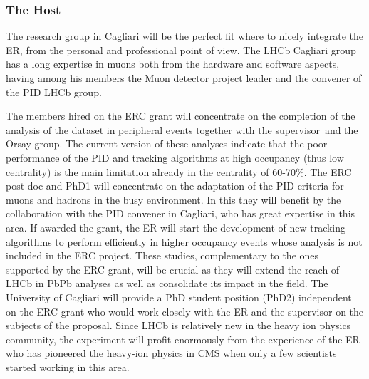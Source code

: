 \documentclass[a4paper,11pt]{article}
\newcommand{\ER}{ER\xspace}
\newcommand{\supervisor}{the supervisor\xspace}
\begin{document}
\subsubsection{The Host}


The research group in Cagliari
will be the perfect fit where to nicely integrate the \ER, from the
personal and professional point of view. 
The LHCb Cagliari group has a long expertise in 
muons both from the hardware and software 
aspects, having among his members the Muon 
detector project leader and the convener of the 
PID LHCb group.

The members hired on the 
ERC grant will 
concentrate on the completion of the \JPsi analysis of the 
\PbPb dataset in peripheral events together with \supervisor\ and the 
Orsay group. The current 
version of these analyses indicate that the 
poor performance of the PID and tracking algorithms at high occupancy 
(thus low centrality) is the main limitation already 
in the centrality of 60-70\%. The ERC post-doc and PhD1 will 
concentrate on the adaptation of the PID criteria
for muons and hadrons in the busy \PbPb environment.
In this they will benefit by the collaboration 
with the PID convener in 
Cagliari, who has great expertise in this area.
If awarded the grant, the \ER will start the development of 
new tracking algorithms to perform efficiently in higher 
occupancy events whose analysis is not included in the ERC project.
These studies, complementary to the ones supported by the 
ERC grant, will be crucial as they will extend the 
reach of LHCb in PbPb analyses as well as consolidate 
its impact in the field.
The University of Cagliari will provide a PhD student position (PhD2) 
independent on the ERC grant who would work closely with the 
\ER and \supervisor on the subjects of the proposal.
Since LHCb is relatively new in the 
heavy ion physics community, the experiment
will profit enormously from the experience 
of the \ER who has pioneered the heavy-ion physics 
in CMS when only a few scientists started working 
in this area. 
\end{document}
